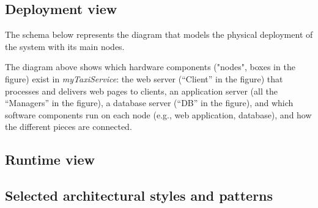 \documentclass[a4paper,11pt]{report} %
\newcommand{\mts}{\mbox{\normalfont\itshape myTaxiService}}
\begin{document}
	\pagebreak
	\subsection{Deployment view}
	The schema below represents the diagram that models the physical deployment of the system with its main nodes.\\
	\begin{minipage}{\linewidth}
	\end{minipage} \linebreak
	The diagram above shows which hardware components ("nodes", boxes in the figure) exist in \mts{}:  the web server (``Client'' in the figure) that processes and delivers web pages to clients, an application server (all the ``Managers'' in the figure), a database server (``DB'' in the figure), and which software components run on each node (e.g., web application, database), and how the different pieces are connected.
	
	\subsection{Runtime view}
	
	\subsection{Selected architectural styles and patterns}
\end{document}
